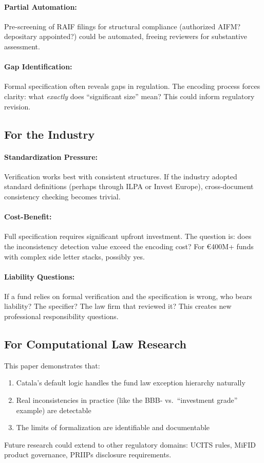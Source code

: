 \paragraph{Partial Automation:} Pre-screening of RAIF filings for structural compliance (authorized AIFM? depositary appointed?) could be automated, freeing reviewers for substantive assessment.

\paragraph{Gap Identification:} Formal specification often reveals gaps in regulation. The encoding process forces clarity: what \textit{exactly} does ``significant size'' mean? This could inform regulatory revision.

\subsection{For the Industry}
\label{sec:industry}

\paragraph{Standardization Pressure:} Verification works best with consistent structures. If the industry adopted standard definitions (perhaps through ILPA or Invest Europe), cross-document consistency checking becomes trivial.

\paragraph{Cost-Benefit:} Full specification requires significant upfront investment. The question is: does the inconsistency detection value exceed the encoding cost? For €400M+ funds with complex side letter stacks, possibly yes.

\paragraph{Liability Questions:} If a fund relies on formal verification and the specification is wrong, who bears liability? The specifier? The law firm that reviewed it? This creates new professional responsibility questions.

\subsection{For Computational Law Research}
\label{sec:research}

This paper demonstrates that:

\begin{enumerate}
  \item Catala's default logic handles the fund law exception hierarchy naturally
  \item Real inconsistencies in practice (like the BBB- vs.\ ``investment grade'' example) are detectable
  \item The limits of formalization are identifiable and documentable
\end{enumerate}

Future research could extend to other regulatory domains: UCITS rules, MiFID product governance, PRIIPs disclosure requirements.
